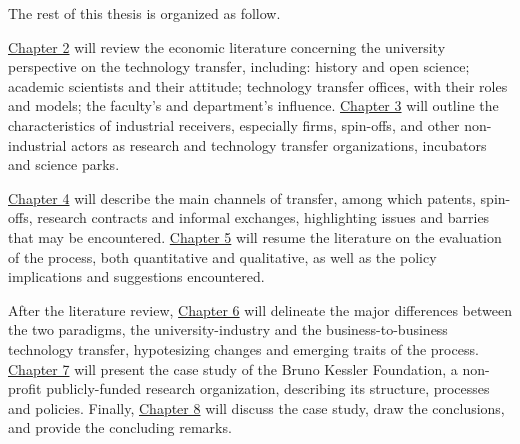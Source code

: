 The rest of this thesis is organized as follow.

\hyperref[Chapter2]{Chapter 2} will review the economic literature concerning the university perspective on the technology transfer, including: history and open science; academic scientists and their attitude; technology transfer offices, with their roles and models; the faculty's and department's influence. \hyperref[Chapter3]{Chapter 3} will outline the characteristics of industrial receivers, especially firms, spin-offs, and other non-industrial actors as research and technology transfer organizations, incubators and science parks. 

\hyperref[Chapter4]{Chapter 4} will describe the main channels of transfer, among which patents, spin-offs, research contracts and informal exchanges, highlighting issues and barries that may be encountered. \hyperref[Chapter5]{Chapter 5} will resume the literature on the evaluation of the process, both quantitative and qualitative, as well as the policy implications and suggestions encountered.

After the literature review, \hyperref[Chapter6]{Chapter 6} will delineate the major differences between the two paradigms, the university-industry and the business-to-business technology transfer, hypotesizing changes and emerging traits of the process. \hyperref[Chapter7]{Chapter 7} will present the case study of the Bruno Kessler Foundation, a non-profit publicly-funded research organization, describing its structure, processes and policies. Finally, \hyperref[Chapter8]{Chapter 8} will discuss the case study, draw the conclusions, and provide the concluding remarks. 